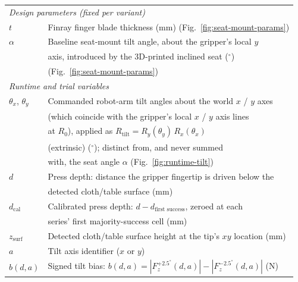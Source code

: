 \medskip
\noindent
\begin{tabular}{l l}
\multicolumn{2}{l}{\textit{Design parameters (fixed per variant)}} \\ [0.5ex]
$t$ & Finray finger blade thickness (mm) (Fig.~\ref{fig:seat-mount-params}) \\ [1ex]
$\alpha$ & Baseline seat-mount tilt angle, about the gripper's local $y$ \\
         & axis, introduced by the 3D-printed inclined seat ($^{\circ}$) \\
         & (Fig.~\ref{fig:seat-mount-params}) \\ [1ex]
\multicolumn{2}{l}{\textit{Runtime and trial variables}} \\ [0.5ex]
$\theta_x$, $\theta_y$ & Commanded robot-arm tilt angles about the world $x$ / $y$ axes \\
                        & (which coincide with the gripper's local $x$ / $y$ axis lines \\
                        & at $R_0$), applied as $R_{\text{tilt}} = R_y(\theta_y)\,R_x(\theta_x)$ \\
                        & (extrinsic) ($^{\circ}$); distinct from, and never summed \\
                        & with, the seat angle $\alpha$ (Fig.~\ref{fig:runtime-tilt}) \\ [1ex]
$d$ & Press depth: distance the gripper fingertip is driven below the \\
    & detected cloth/table surface (mm) \\ [1ex]
$d_{\text{cal}}$ & Calibrated press depth: $d - d_{\text{first success}}$, zeroed at each \\
                  & series' first majority-success cell (mm) \\ [1ex]
$z_{\text{surf}}$ & Detected cloth/table surface height at the tip's $xy$ location (mm) \\ [1ex]
$a$ & Tilt axis identifier ($x$ or $y$) \\ [1ex]
$b(d,a)$ & Signed tilt bias: $b(d,a) = |F_z^{+2.5^{\circ}}(d,a)| - |F_z^{-2.5^{\circ}}(d,a)|$ (N) \\ [1ex]
\end{tabular}

